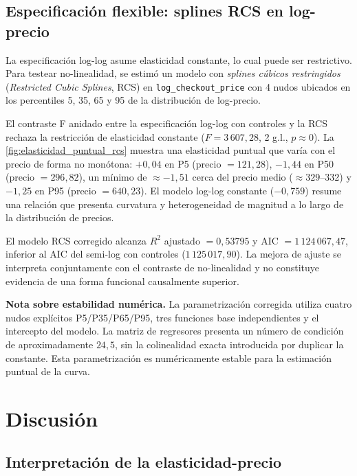 \documentclass[doc, a4paper, biblatex, floatsintext, longtable, babel]{apa7}
\begin{document}
\subsection{Especificaci\'on flexible: splines RCS en log-precio}
\label{subsec:rcs_splines}

La especificaci\'on log-log asume elasticidad constante, lo cual puede ser restrictivo. Para testear no-linealidad, se estim\'o un modelo con \textit{splines cúbicos restringidos} (\textit{Restricted Cubic Splines}, RCS) en \texttt{log\_checkout\_price} con 4 nudos ubicados en los percentiles 5, 35, 65 y 95 de la distribuci\'on de log-precio.

El contraste F anidado entre la especificación log-log con controles y la RCS rechaza la restricción de elasticidad constante ($F = 3\,607,28$, 2 g.l., $p \approx 0$). La \cref{fig:elasticidad_puntual_rcs} muestra una elasticidad puntual que varía con el precio de forma no monótona: $+0,04$ en P5 (precio $=121,28$), $-1,44$ en P50 (precio $=296,82$), un mínimo de $\approx -1,51$ cerca del precio medio ($\approx 329$--332) y $-1,25$ en P95 (precio $=640,23$). El modelo log-log constante ($-0,759$) resume una relación que presenta curvatura y heterogeneidad de magnitud a lo largo de la distribución de precios.

El modelo RCS corregido alcanza $R^2$ ajustado $=0,53795$ y AIC $=1\,124\,067,47$, inferior al AIC del semi-log con controles ($1\,125\,017,90$). La mejora de ajuste se interpreta conjuntamente con el contraste de no-linealidad y no constituye evidencia de una forma funcional causalmente superior.

\textbf{Nota sobre estabilidad numérica.} La parametrización corregida utiliza cuatro nudos explícitos P5/P35/P65/P95, tres funciones base independientes y el intercepto del modelo. La matriz de regresores presenta un número de condición de aproximadamente $24,5$, sin la colinealidad exacta introducida por duplicar la constante. Esta parametrización es numéricamente estable para la estimación puntual de la curva.

\section{Discusi\'on}
\label{sec:discusion}

\subsection{Interpretaci\'on de la elasticidad-precio}
\label{subsec:interpretacion}
\end{document}
